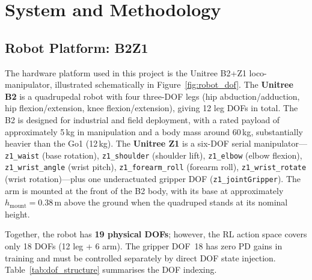 
\chapter{System and Methodology}
\label{chp:method}

\section{Robot Platform: B2Z1}
\label{sec:platform}

The hardware platform used in this project is the Unitree B2+Z1
loco-manipulator, illustrated schematically in
Figure~\ref{fig:robot_dof}.
The \textbf{Unitree B2} is a quadrupedal robot with four three-DOF legs
(hip abduction/adduction, hip flexion/extension, knee flexion/extension),
giving 12 leg DOFs in total.
The B2 is designed for industrial and field deployment, with a rated payload
of approximately 5\,kg in manipulation and a body mass around 60\,kg,
substantially heavier than the Go1 (12\,kg).
The \textbf{Unitree Z1} is a six-DOF serial manipulator---
\texttt{z1\_waist} (base rotation),
\texttt{z1\_shoulder} (shoulder lift),
\texttt{z1\_elbow} (elbow flexion),
\texttt{z1\_wrist\_angle} (wrist pitch),
\texttt{z1\_forearm\_roll} (forearm roll),
\texttt{z1\_wrist\_rotate} (wrist rotation)---plus one underactuated
gripper DOF (\texttt{z1\_jointGripper}).
The arm is mounted at the front of the B2 body, with its base at
approximately $h_\text{mount} = 0.38$\,m above the ground when the
quadruped stands at its nominal height.

Together, the robot has \textbf{19 physical DOFs}; however, the RL action
space covers only 18 DOFs (12 leg + 6 arm).
The gripper DOF~18 has zero PD gains in training and must be controlled
separately by direct DOF state injection.
Table~\ref{tab:dof_structure} summarises the DOF indexing.

